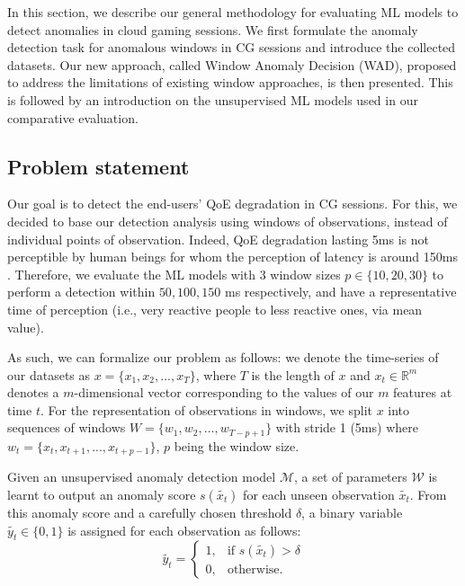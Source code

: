 In this section, we describe our general methodology for evaluating ML models to detect anomalies in cloud gaming sessions. We first formulate the anomaly detection task for anomalous windows in CG sessions and introduce the collected datasets. Our new approach, called Window Anomaly Decision (WAD), proposed to address the limitations of existing window approaches, is then presented. This is followed by an introduction on the unsupervised ML models used in our comparative evaluation.


\subsection{Problem statement}
Our goal is to detect the end-users' QoE degradation in CG sessions. For this, we decided to base our detection analysis using windows of observations, instead of individual points of observation. Indeed, QoE degradation lasting 5ms is not perceptible by human beings for whom the perception of latency is around 150ms \cite{Amano2006EstimationOT}. Therefore, we evaluate the ML models with 3 window sizes $p \in \{10,20,30\}$ to perform a detection within $50, 100, 150$ ms respectively, and have a representative time of perception (i.e., very reactive people to less reactive ones, via mean value).

As such, we can formalize our problem as follows: we denote the time-series of our datasets as $x = \{x_1,x_2, ..., x_T\}$, where $T$ is the length of $x$ and $x_t \in \mathbb{R}^m$ denotes a $m$-dimensional vector corresponding to the values of our $m$ features at time $t$. For the representation of observations in windows, we split $x$ into sequences of windows $W = \{w_1, w_2, ..., w_{T-p+1}\}$ with stride 1 (5ms) where $w_t = \{x_t, x_{t+1}, ..., x_{t+p-1}\}$, $p$ being the window size.

Given an unsupervised anomaly detection model $\mathcal{M}$, a set of parameters $\mathcal{W}$ is learnt to output an anomaly score $s(\tilde{x_t})$ for each unseen observation $\tilde{x_t}$. From this anomaly score and a carefully chosen threshold $\delta$, a binary variable $\tilde{y_t} \in \{0,1\}$ is assigned for each observation as follows:
\begin{equation}
    \tilde{y_t} = 
    \begin{cases}
       1, & \text{if } s(\tilde{x_t}) > \delta \\
       0, & \text{otherwise.}
    \end{cases}
\end{equation}

